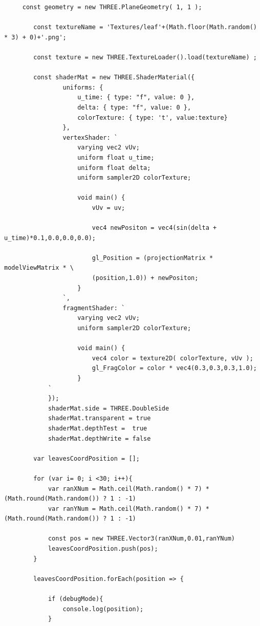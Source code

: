 \documentclass[10pt,a4paper]{article}
\begin{document}
\begin{verbatim}
     const geometry = new THREE.PlaneGeometry( 1, 1 );
    
        const textureName = 'Textures/leaf'+(Math.floor(Math.random() * 3) + 0)+'.png';

        const texture = new THREE.TextureLoader().load(textureName) ;

        const shaderMat = new THREE.ShaderMaterial({
                uniforms: {
                    u_time: { type: "f", value: 0 },
                    delta: { type: "f", value: 0 },
                    colorTexture: { type: 't', value:texture}
                },
                vertexShader: `
                    varying vec2 vUv;
                    uniform float u_time;
                    uniform float delta;
                    uniform sampler2D colorTexture;

                    void main() {
                        vUv = uv;

                        vec4 newPositon = vec4(sin(delta + u_time)*0.1,0.0,0.0,0.0);

                        gl_Position = (projectionMatrix * modelViewMatrix * \	
                        (position,1.0)) + newPositon;
                    }
                `,
                fragmentShader: `
                    varying vec2 vUv;
                    uniform sampler2D colorTexture;

                    void main() {
                        vec4 color = texture2D( colorTexture, vUv );
                        gl_FragColor = color * vec4(0.3,0.3,0.3,1.0);
                    }
            `
            });
            shaderMat.side = THREE.DoubleSide
            shaderMat.transparent = true
            shaderMat.depthTest =  true
            shaderMat.depthWrite = false
        
        var leavesCoordPosition = [];

        for (var i= 0; i <30; i++){
            var ranXNum = Math.ceil(Math.random() * 7) * (Math.round(Math.random()) ? 1 : -1)
            var ranYNum = Math.ceil(Math.random() * 7) * (Math.round(Math.random()) ? 1 : -1)

            const pos = new THREE.Vector3(ranXNum,0.01,ranYNum)
            leavesCoordPosition.push(pos);     
        }
    
        leavesCoordPosition.forEach(position => {

            if (debugMode){
                console.log(position);
            }
       

\end{verbatim}
\end{document}
